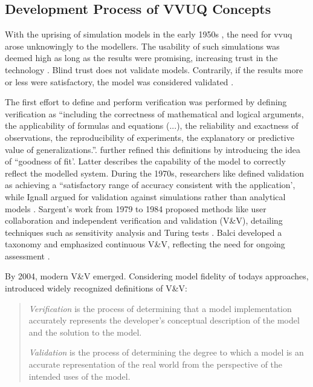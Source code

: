 \subsection{Development Process of VVUQ Concepts}
\label{sec:historical-development}
With the uprising of simulation models in the early 1950s \autocite{evans1967simulation}, the need for \gls{vvuq} arose unknowingly to the modellers. The usability of such simulations was deemed high as long as the results were promising, increasing trust in the technology \autocite{durst2017historical}. Blind trust does not validate models. Contrarily, if the results more or less were satisfactory, the model was considered validated \autocite{bonani2003physics}.

The first effort to define and perform verification was performed by \textcite{machlup1955problem} defining verification as ``including the correctness of mathematical and logical arguments, the applicability of formulas and equations (...), the reliability and exactness of observations, the reproducibility of experiments, the explanatory or predictive value of generalizations.''. \Textcite{naylor1967verification} further refined this definitions by introducing the idea of ``goodness of fit'. Latter describes the capability of the model to correctly reflect the modelled system. During the 1970s, researchers like \textcite{schlesinger1979terminology} defined validation as achieving a ``satisfactory range of accuracy consistent with the application', while Ignall argued for validation against simulations rather than analytical models \autocite{ignall1978using}. Sargent's work from 1979 to 1984 proposed methods like user collaboration and independent verification and validation (V\&V), detailing techniques such as sensitivity analysis and Turing tests \autocite{Sargent2010wsc}. Balci developed a taxonomy and emphasized continuous V\&V, reflecting the need for ongoing assessment \autocite{balci2012life}.

By 2004, modern V\&V emerged. Considering model fidelity of todays approaches, \textcite{Oberkampf2004amr} introduced widely recognized definitions of V\&V:

\begin{quote}
  \textit{Verification} is the process of determining that a model implementation accurately represents the developer's conceptual description of the model and the solution to the model.

  \textit{Validation} is the process of determining the degree to which a model is an accurate representation of the real world from the perspective of the intended uses of the model. \autocite{Oberkampf2004amr}
\end{quote}

